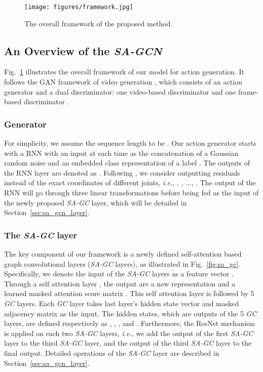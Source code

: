\documentclass[runningheads]{llncs}
\begin{document}
\begin{figure}[!t]
    \centering
    \texttt{[image: figures/framework.jpg]}
    \caption{\small{The overall framework of the proposed method.}}
    \label{fig:framework}
\end{figure}




\subsection{An Overview of the {\it SA-GCN}}



Fig.~\ref{fig:framework} illustrates the overall framework of our model for action generation. It follows the GAN framework of video generation \cite{tulyakov2018mocogan,clark2019efficient}, which consists of an action generator   and a dual discriminator: one video-based discriminator  and one frame-based discriminator .




\subsubsection{Generator}
For simplicity, we assume the sequence length to be . 
Our action generator starts with a RNN with an input at each time as the concatenation of a Gaussian random noise  and an embedded class representation of a label . The outputs of the RNN layer are denoted as . Following \cite{cai2018deep,wang2019learning}, we consider outputting residuals instead of the exact coordinates of different joints, {\it i.e.}, , , ..., . The output of the RNN will go through three linear transformations before being fed as the input of the newly proposed {\it SA-GC} layer, which will be detailed in Section~\ref{sec:sa_gcn_layer}.



\subsubsection{{The \it SA-GC} layer}
The key component of our framework is a newly defined self-attention based graph convolutional layers ({\it SA-GC} layers), as illustrated in Fig.~\ref{fig:sa_gc}. Specifically, we denote the input of the {\it SA-GC} layers as a feature vector . Through a self attention layer \cite{vaswani2017attention}, the output are a new representation  and a learned masked attention score matrix 
. This self attention layer is followed by 5 {\it GC} layers. Each {\it GC} layer takes last layer's hidden state vector and masked adjacency matrix  as the input. The hidden states, which are outputs of the 5 {\it GC} layers, are defined respectively as , , ,  and .
Furthermore, the ResNet mechanism \cite{he2016deep} is applied on each two {\it SA-GC} layers, {\it i.e.}, we add the output of the first {\it SA-GC} layer to the third {\it SA-GC} layer, and the output of the third {\it SA-GC} layer to the final output. Detailed operations of the {\it SA-GC} layer are described in Section~\ref{sec:sa_gcn_layer}.
\end{document}
